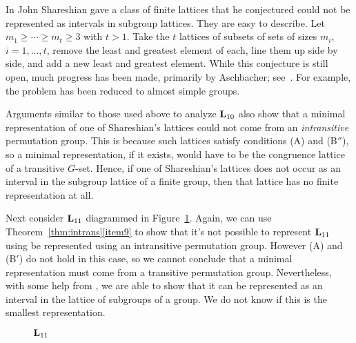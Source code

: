 In \cite{Shareshian2003} John Shareshian gave a class of finite lattices that
he conjectured could not be represented as intervals in subgroup lattices.
They are easy to describe. Let $m_1 \ge \cdots \ge m_t \ge 3$ with $t> 1$.
Take the $t$ lattices of subsets of sets of sizes $m_i$, $i=1,\ldots,t$, remove
the least and greatest element of each, line them up side by side, and add
a new least and greatest element. While this conjecture is still open, much
progress has been made, primarily by Aschbacher; see~\cite{Aschbacher2013}.
For example, the problem has been reduced to almost simple groups.


Arguments similar to those used above to analyze $\bL_{10}$
also show that a minimal representation of one of Shareshian's
lattices could not come from an \emph{intransitive} permutation group.
This is because such lattices satisfy conditions (A) and (B$''$),
so a minimal representation, if it exists, would have to be
the congruence lattice of a transitive $G$-set.
Hence, if one of Shareshian's lattices does not occur as an
interval in the subgroup lattice of a finite group, then that lattice has
no finite representation at all.



Next consider $\bL_{11}$ diagrammed in Figure~\ref{fig:L11}. Again, we
can use Theorem~\ref{thm:intrans}\eqref{item9} to show that it's not possible to
represent $\bL_{11}$ using be represented using an intransitive permutation group. However (A) and
(B$'$) do not hold in this case, so we cannot conclude that a minimal representation
must come from a transitive permutation group. Nevertheless, with some help from
\gap, we are able to show that it can be represented as an interval
in the lattice of subgroups of a group. We do not know if this is the
smallest representation.


\begin{figure}[htb]
\begin{center}
  \begin{tikzpicture}[scale=1]
    
  \end{tikzpicture}
\end{center}
\caption{$\bL_{11}$}\label{fig:L11}
\end{figure}

